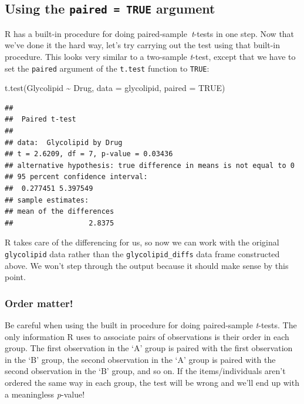 \documentclass[
]{book}
\newenvironment{Shaded}{\begin{snugshade}}{\end{snugshade}}
\newcommand{\AttributeTok}[1]{\textcolor[rgb]{0.77,0.63,0.00}{#1}}
\newcommand{\ConstantTok}[1]{\textcolor[rgb]{0.00,0.00,0.00}{#1}}
\newcommand{\FunctionTok}[1]{\textcolor[rgb]{0.00,0.00,0.00}{#1}}
\newcommand{\NormalTok}[1]{#1}
\newcommand{\SpecialCharTok}[1]{\textcolor[rgb]{0.00,0.00,0.00}{#1}}
\newenvironment{greybox}{
  \definecolor{shadecolor}{rgb}{0.95,0.95,0.95}  %
  \color{black}
  \begin{shaded}}
 {\end{shaded}}
\newenvironment{infobox}[1]
  {
  \begin{itemize}
  \renewcommand{\labelitemi}{
    \raisebox{-.7\height}[0pt][0pt]{
      {\setkeys{Gin}{width=3em,keepaspectratio}
        \texttt{[image: images/\#1]}}
    }
  }
  \setlength{\fboxsep}{1em}
  \begin{greybox}
  \item
  }
  {
  \end{greybox}
  \end{itemize}
  }
\begin{document}
\hypertarget{using-the-paired-true-argument}{%
\subsection{\texorpdfstring{Using the \texttt{paired\ =\ TRUE} argument}{Using the paired = TRUE argument}}\label{using-the-paired-true-argument}}

R has a built-in procedure for doing paired-sample~\emph{t}-tests in one step. Now that we've done it the hard way, let's try carrying out the test using that built-in procedure. This looks very similar to a two-sample \emph{t}-test, except that we have to set the \texttt{paired} argument of the \texttt{t.test} function to \texttt{TRUE}:

\begin{Shaded}
\begin{Highlighting}[]
\FunctionTok{t.test}\NormalTok{(Glycolipid }\SpecialCharTok{\textasciitilde{}}\NormalTok{ Drug, }\AttributeTok{data =}\NormalTok{ glycolipid, }\AttributeTok{paired =} \ConstantTok{TRUE}\NormalTok{)}
\end{Highlighting}
\end{Shaded}

\begin{verbatim}
## 
##  Paired t-test
## 
## data:  Glycolipid by Drug
## t = 2.6209, df = 7, p-value = 0.03436
## alternative hypothesis: true difference in means is not equal to 0
## 95 percent confidence interval:
##  0.277451 5.397549
## sample estimates:
## mean of the differences 
##                  2.8375
\end{verbatim}

R takes care of the differencing for us, so now we can work with the original \texttt{glycolipid} data rather than the \texttt{glycolipid\_diffs} data frame constructed above. We won't step through the output because it should make sense by this point.

\begin{infobox}{action}

\hypertarget{order-matter}{%
\subsubsection*{Order matter!}\label{order-matter}}

Be careful when using the built in procedure for doing paired-sample \emph{t}-tests. The only information R uses to associate pairs of observations is their order in each group. The first observation in the `A' group is paired with the first observation in the `B' group, the second observation in the `A' group is paired with the second observation in the `B' group, and so on. If the items/individuals aren't ordered the same way in each group, the test will be wrong and we'll end up with a meaningless \emph{p}-value!

\end{infobox}
\end{document}
